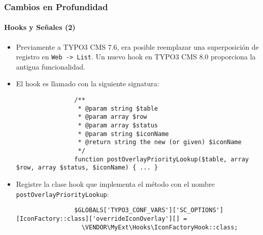 \begin{frame}[fragile]
	\frametitle{Cambios en Profundidad}
	\framesubtitle{Hooks y Señales (2)}

	\lstset{basicstyle=\tiny\ttfamily}

	\begin{itemize}

		\item Previamente a TYPO3 CMS 7.6, era posible reemplazar una superposición de registro en \texttt{Web -> List}.
			Un nuevo hook en TYPO3 CMS 8.0 proporciona la antigua funcionalidad.

		\item El hook es llamado con la siguiente signatura:
			\begin{lstlisting}
				/**
				 * @param string $table
				 * @param array $row
				 * @param array $status
				 * @param string $iconName
				 * @return string the new (or given) $iconName
				 */
				function postOverlayPriorityLookup($table, array $row, array $status, $iconName) { ... }
			\end{lstlisting}

		\item Registre la clase hook que implementa el método con el nombre \texttt{postOverlayPriorityLookup}:

			\begin{lstlisting}
				$GLOBALS['TYPO3_CONF_VARS']['SC_OPTIONS'][IconFactory::class]['overrideIconOverlay'][] =
				  \VENDOR\MyExt\Hooks\IconFactoryHook::class;
			\end{lstlisting}

	\end{itemize}

\end{frame}

